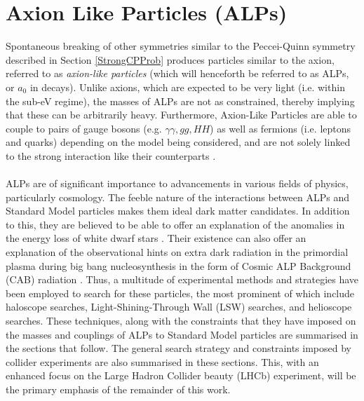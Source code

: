 \section{Axion Like Particles (ALPs)}
Spontaneous breaking of other symmetries similar to the Peccei-Quinn symmetry described in Section \ref{StrongCPProb} produces particles similar to the axion, referred to as \textit{axion-like particles} (which will henceforth be referred to as ALPs, or $a_{0}$ in decays). Unlike axions, which are expected to be very light (i.e. within the sub-eV regime), the masses of ALPs 
are not as constrained, thereby implying that these can be arbitrarily heavy. Furthermore, Axion-Like Particles are able to couple to pairs of
gauge bosons (e.g. $\gamma\gamma, gg, HH$) as well as fermions (i.e. leptons and quarks) depending on the model being considered, and are not solely linked to the strong interaction like their
counterparts \cite{Michael:920}. \\
\\
ALPs are of significant importance to advancements in various fields of physics, particularly cosmology. The feeble nature of the interactions between ALPs and Standard Model particles makes them ideal dark matter candidates. In addition to this, they
are believed to be able to offer an explanation of the anomalies in the energy loss of white dwarf stars \cite{Isern_2008}. Their existence can also offer an explanation of the observational hints on extra dark radiation in the primordial plasma during big bang nucleosynthesis in the form
of Cosmic ALP Background (CAB) radiation \cite{https://doi.org/10.48550/arxiv.1407.0546}. Thus, a multitude of experimental methods and strategies have been employed to search for these particles, the most prominent of which include haloscope searches, Light-Shining-Through Wall (LSW) searches, and helioscope searches. These
techniques, along with the constraints that they have imposed on the masses and couplings of ALPs to Standard Model particles are summarised in the sections that follow. The general search strategy and constraints imposed by collider experiments are also summarised in these sections. This, with an enhanced focus on the Large Hadron Collider beauty (LHCb) experiment,
will be the primary emphasis of the remainder of this work. 

